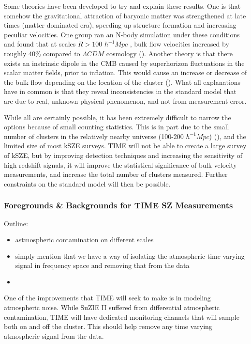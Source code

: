 \documentclass[manuscript]{aastex}
\begin{document}
Some theories have been developed to try and explain these results. One is that somehow the gravitational attraction of baryonic matter was strengthened at late times (matter dominated era), speeding up structure formation and increasing peculiar velocities. One group ran an N-body simulation under these conditions and found that at scales  \(R > 100\) \(h^{-1} Mpc\) , bulk flow velocities increased by roughly \(40\%\) compared to \(\Lambda CDM\) cosmology (\cite{Wyman2010}). Another theory is that there exists an instrinsic dipole in the CMB caused by superhorizon fluctuations in the scalar matter fields, prior to inflation. This would cause an increase or decrease of the bulk flow depending on the location of the cluster (\cite{Mak2011}).  What all explanations have in common is that they reveal inconsistencies in the standard model that are due to real, unknown physical phenomenon, and not from measurement error. 

While all are certainly possible, it has been extremely difficult to narrow the options because of small counting statistics. This is in part due to the small number of clusters in the relatively nearby universe (100-200 \(h^{-1} Mpc\)) (\cite{Lavaux2013}), and the limited size of most kSZE surveys. TIME will not be able to create a large survey of kSZE, but by improving detection techniques and increasing the sensitivity of high redshift signals, it will improve the statistical significance of bulk velocity measurements, and increase the total number of clusters measured. Further constraints on the standard model will then be possible.  

\subsubsection{Foregrounds \& Backgrounds for TIME SZ Measurements}

Outline:
\begin{itemize}
    \item astmospheric contamination on different scales
    \item simply mention that we have a way of isolating the atmospheric time varying signal in frequency space and removing that from the data
    \item 
\end{itemize}

One of the improvements that TIME will seek to make is in modeling atmospheric noise. While SuZIE II suffered from differential atmospheric contamination, TIME will have dedicated monitoring channels that will sample both on and off the cluster. This should help remove any time varying atmospheric signal from the data.
\end{document}
